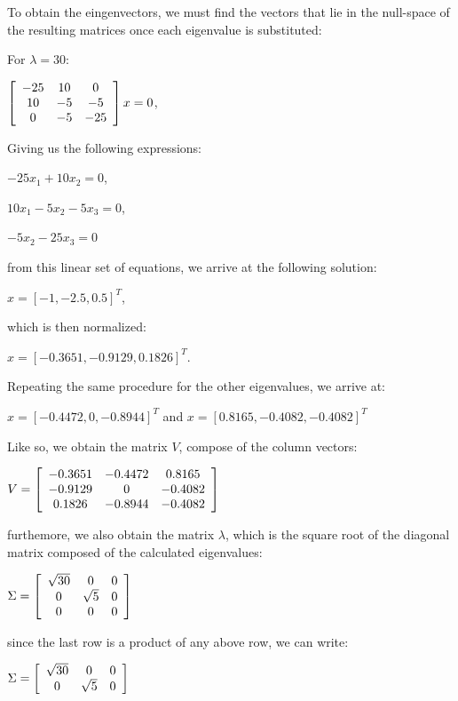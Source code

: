 \documentclass[]{article}
\begin{document}
To obtain the eingenvectors, we must find the vectors that lie in the null-space of the resulting matrices once
each eigenvalue is substituted:

For $\lambda = 30$: 

\centerline{ $\left[ {\begin{array}{*{20}c}
		-25 & 10 & 0 \\
		10 & -5 & -5 \\ 
		0 & -5 & -25   
		\end{array} } \right] x = 0$,  }

Giving us the following expressions: 

\centerline {
	$-25x_{1} + 10x_{2} = 0$, 
}
\centerline {
	$10x_{1} - 5x_{2} - 5x_{3} =0$, 
}
\centerline {
	$-5x_{2} - 25x_{3} = 0$	
}

from this linear set of equations, we arrive at the following solution: 

\centerline {
	$x = [-1, -2.5, 0.5]^T$,
}

which is then normalized: 

\centerline {
	$x = [-0.3651, -0.9129, 0.1826]^T$.
}

Repeating the same procedure for the other eigenvalues, we arrive at: 

\centerline {
	$x = [-0.4472, 0, -0.8944]^T$ and $x = [0.8165, -0.4082, -0.4082]^T$
}

Like so, we obtain the matrix $V$, compose of the column vectors: 

\centerline{ $V = \left[ {\begin{array}{*{20}c}
		-0.3651 & -0.4472 & 0.8165 \\
		-0.9129 & 0 & -0.4082 \\ 
		0.1826 & -0.8944 & -0.4082   
		\end{array} } \right]$ 
}
	
furthemore, we also obtain the matrix $\lambda$, which is the square root of the diagonal matrix composed of the calculated eigenvalues: 

\centerline{ $\Sigma = \left[ {\begin{array}{*{20}c}
		\sqrt{30} & 0 & 0 \\
		0 & \sqrt{5} & 0 \\ 
		0 & 0 & 0   
		\end{array} } \right]$ 
}

since the last row is a product of any above row, we can write:

\centerline{ $\Sigma = \left[ {\begin{array}{*{20}c}
		\sqrt{30} & 0 & 0 \\
		0 & \sqrt{5} & 0   
		\end{array} } \right]$ 
}
\end{document}
